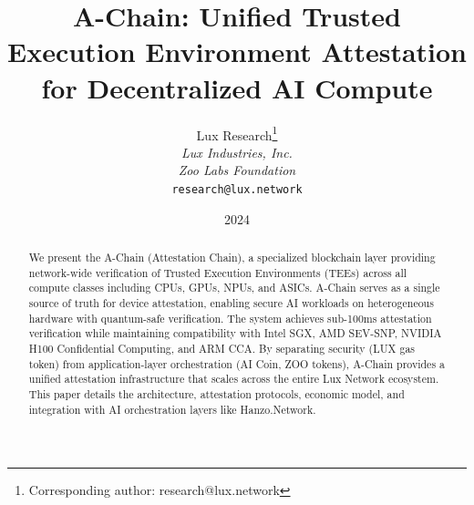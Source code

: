 \documentclass[11pt,a4paper]{article}
\title{A-Chain: Unified Trusted Execution Environment Attestation for Decentralized AI Compute}
\author{
Lux Research\thanks{Corresponding author: research@lux.network}\\
\textit{Lux Industries, Inc.}
\quad
\\
\textit{Zoo Labs Foundation}\\
\texttt{research@lux.network}
}
\date{2024}
\begin{document}
\luxcoverpage
\begin{abstract}
We present the A-Chain (Attestation Chain), a specialized blockchain layer providing network-wide verification of Trusted Execution Environments (TEEs) across all compute classes including CPUs, GPUs, NPUs, and ASICs. A-Chain serves as a single source of truth for device attestation, enabling secure AI workloads on heterogeneous hardware with quantum-safe verification. The system achieves sub-100ms attestation verification while maintaining compatibility with Intel SGX, AMD SEV-SNP, NVIDIA H100 Confidential Computing, and ARM CCA. By separating security (LUX gas token) from application-layer orchestration (AI Coin, ZOO tokens), A-Chain provides a unified attestation infrastructure that scales across the entire Lux Network ecosystem. This paper details the architecture, attestation protocols, economic model, and integration with AI orchestration layers like Hanzo.Network.
\end{abstract}















\end{document}
